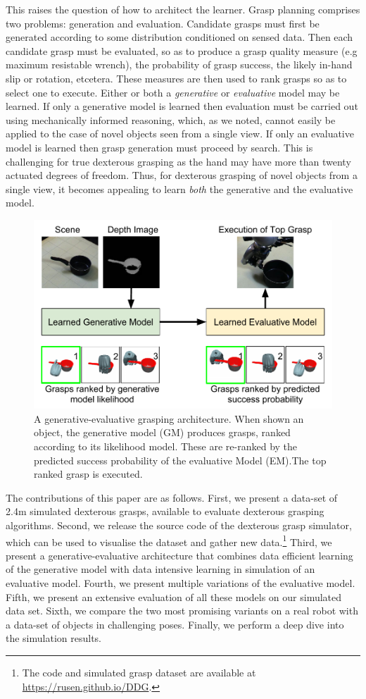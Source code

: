 This raises the question of how to architect the learner. Grasp planning comprises two problems: generation and evaluation. Candidate grasps must first be generated according to some distribution conditioned on sensed data. Then each candidate grasp must be evaluated, so as to produce a grasp quality measure (e.g maximum resistable wrench), the probability of grasp success, the likely in-hand slip or rotation, etcetera. These measures are then used to rank grasps so as to select one to execute. Either or both a {\em generative} or {\em evaluative} model may be learned. If only a generative model is learned then evaluation must be carried out using mechanically informed reasoning, which, as we noted, cannot easily be applied to the case of novel objects seen from a single view. If only an evaluative model is learned then grasp generation must proceed by search. This is challenging for true dexterous grasping as the hand may have more than twenty actuated degrees of freedom. Thus, for dexterous grasping of novel objects from a single view, it becomes appealing to learn {\em both} the generative and the evaluative model. 
\begin{figure}[t]
\begin{center}
  \includegraphics[width=0.7\columnwidth]{images/contribution.pdf}
  \end{center}
  \caption{A generative-evaluative grasping architecture. When shown an object, the generative model (GM) produces grasps, ranked according to its likelihood model. These are re-ranked by the predicted success probability of the evaluative Model (EM).The top ranked grasp is executed.}
\label{fig:systemArchitecture}
\end{figure}

The contributions of this paper are as follows. First, we present a data-set of 2.4m simulated dexterous grasps, available to evaluate dexterous grasping algorithms. Second, we release the source code of the dexterous grasp simulator, which can be used to visualise the dataset and gather new data.\footnote{The code and simulated grasp dataset are available at \href{https://rusen.github.io/DDG}{https://rusen.github.io/DDG}.} Third, we present a generative-evaluative architecture that combines data efficient learning of the generative model with data intensive learning in simulation of an evaluative model. Fourth, we present multiple variations of the evaluative model. Fifth, we present an extensive evaluation of all these models on our simulated data set. Sixth, we compare the two most promising variants on a real robot with a data-set of objects in challenging poses. Finally, we perform a deep dive into the simulation results.

